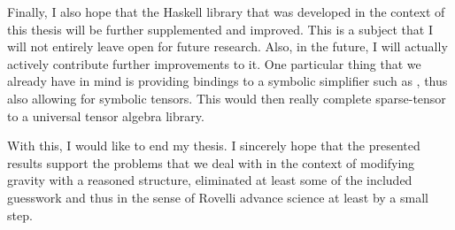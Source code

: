 Finally, I also hope that the Haskell library that was developed in the context of this thesis will be further supplemented and improved. This is a subject that I will not entirely leave open for future research. Also, in the future, I will actually actively contribute further improvements to it. One particular thing that we already have in mind is providing bindings to a symbolic simplifier such as \cite{SymPy}, thus also allowing for symbolic tensors. This would then really complete sparse-tensor to a universal tensor algebra library.

With this, I would like to end my thesis. I sincerely hope that the presented results support the problems that we deal with in the context of modifying gravity with a reasoned structure, eliminated at least some of the included guesswork and thus in the sense of Rovelli advance science at least by a small step.
